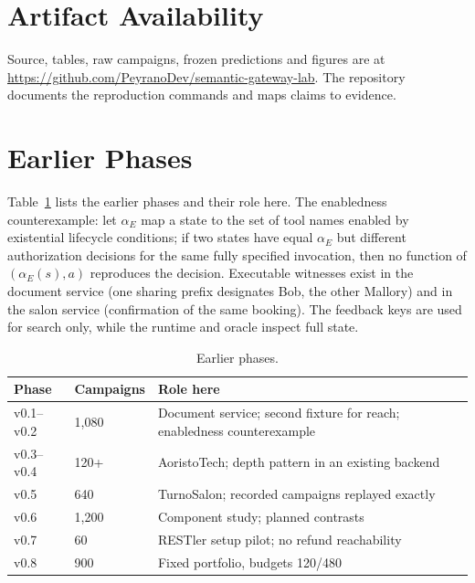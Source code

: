 \documentclass[conference]{IEEEtran}
\begin{document}
\section*{Artifact Availability}
Source, tables, raw campaigns, frozen predictions and figures are at
\url{https://github.com/PeyranoDev/semantic-gateway-lab}. The repository documents the
reproduction commands and maps claims to evidence.

\appendices
\section{Earlier Phases}
\label{app:earlier}
Table~\ref{tab:phases} lists the earlier phases and their role here. The enabledness
counterexample: let $\alpha_E$ map a state to the set of tool names enabled by existential
lifecycle conditions; if two states have equal $\alpha_E$ but different authorization
decisions for the same fully specified invocation, then no function of $(\alpha_E(s),a)$
reproduces the decision. Executable witnesses exist in the document service (one sharing
prefix designates Bob, the other Mallory) and in the salon service (confirmation of the
same booking). The feedback keys are used for search only, while the runtime and oracle
inspect full state.

\begin{table}[t]
\caption{Earlier phases.}
\label{tab:phases}
\centering
\footnotesize
\begin{tabular}{@{}lp{1.0cm}p{3.0cm}@{}}
\toprule
Phase & Campaigns & Role here \\
\midrule
v0.1--v0.2 & 1{,}080 & Document service; second fixture for reach; enabledness counterexample \\
v0.3--v0.4 & 120+ & AoristoTech; depth pattern in an existing backend \\
v0.5 & 640 & TurnoSalon; recorded campaigns replayed exactly \\
v0.6 & 1{,}200 & Component study; planned contrasts \\
v0.7 & 60 & RESTler setup pilot; no refund reachability \\
v0.8 & 900 & Fixed portfolio, budgets 120/480 \\
\bottomrule
\end{tabular}
\end{table}



\end{document}
